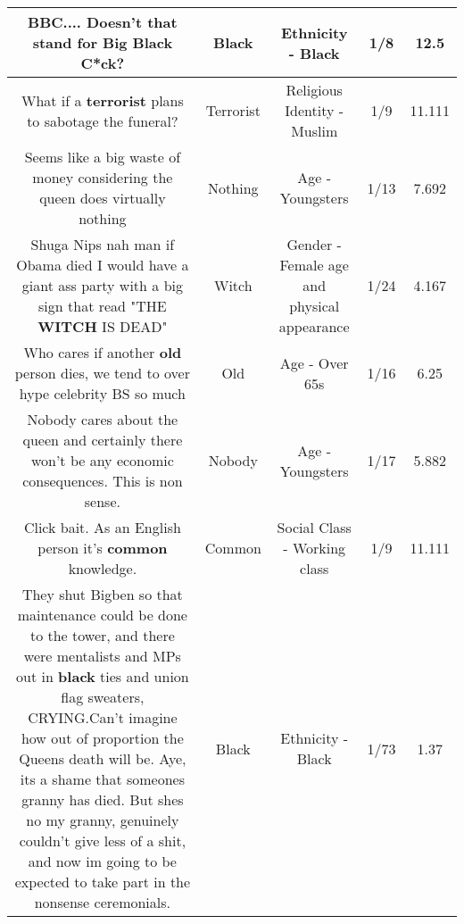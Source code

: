\documentclass[11pt]{article}
\newlength\mylength
\begin{document}
\begin{center}
\begin{longtable}{|C{.65\mylength}|C{.30\mylength}|C{.12\mylength}|C{.12\mylength}|C{.12\mylength}|}
  \small BBC.... Doesn't that stand for Big \textbf{Black} C*ck?\normalsize   & Black & Ethnicity - Black & 1/8 & 12.5 \\  \hline
  \small What if a \textbf{terrorist} plans to sabotage the funeral?\normalsize   & Terrorist & Religious Identity - Muslim & 1/9 & 11.111 \\  \hline
  \small Seems like a big waste of money considering the queen does virtually nothing\normalsize   & Nothing & Age - Youngsters & 1/13 & 7.692 \\  \hline
  \small Shuga Nips nah man if Obama died I would have a giant ass party with a big sign that read "THE \textbf{WITCH} IS DEAD"\normalsize   & Witch & Gender - Female age and physical appearance & 1/24 & 4.167 \\  \hline
  \small Who cares if another \textbf{old} person dies, we tend to over hype celebrity BS so much\normalsize   & Old & Age - Over 65s & 1/16 & 6.25 \\  \hline
  \small Nobody cares about the queen and certainly there won't be any economic consequences. This is non sense.\normalsize   & Nobody & Age - Youngsters & 1/17 & 5.882 \\  \hline
  \small Click bait. As an English person it's \textbf{common} knowledge.\normalsize   & Common & Social Class - Working class & 1/9 & 11.111 \\  \hline
  \small They shut Bigben so that maintenance could be done to the tower, and there were mentalists and MPs out in \textbf{black} ties and union flag sweaters, CRYING.Can't imagine how out of proportion the Queens death will be. Aye, its a shame that someones granny has died. But shes no my granny, genuinely couldn't give less of a shit, and now im going to be expected to take part in the nonsense ceremonials.\normalsize   & Black & Ethnicity - Black & 1/73 & 1.37 \\  \hline

\end{longtable}
\end{center}
\end{document}
